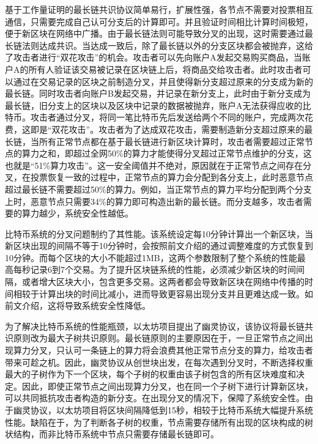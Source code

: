 基于工作量证明的最长链共识协议简单易行，扩展性强，各节点不需要对投票相互通信，只需要完成自己认可分支后的计算即可。并且验证时间相比计算时间极短，便于新区块在网络中广播。由于最长链法则可能导致分叉的出现，这时需要通过最长链法则达成共识。当达成一致后，除了最长链以外的分支区块都会被抛弃，这给了攻击者进行“双花攻击”的机会。攻击者可以先向账户A发起交易购买商品，当账户A的所有人验证该交易被记录在区块链上后，将商品交给攻击者。此时攻击者可以通过在交易记录的区块之前制造分叉，并且使得新分支超过原来的分支成为新的最长链。同时攻击者向账户B发起交易，并记录在新分支上，此时由于新分支成为最长链，旧分支上的区块以及区块中记录的数据被抛弃，账户A无法获得应收的比特币。攻击者通过分叉，将同一笔比特币先后发送给两个不同的账户，完成两次花费，这即是“双花攻击”。攻击者为了达成双花攻击，需要制造新分支超过原来的最长链，当所有正常节点都在基于最长链进行新区块计算时，攻击者需要超过正常节点的算力之和，即超过全网50\%的算力才能使得分叉超过正常节点维护的分支，这也就是“51\%算力攻击”。这一安全阈值并不绝对，原因就在于正常节点之间存在分叉，在投票恢复一致的过程中，正常节点的算力会分配到各分支上，此时恶意节点超过最长链不需要超过50\%的算力。例如，当正常节点的算力平均分配到两个分支上时，恶意节点只需要34\%的算力即可构造出新的最长链。而分支越多，攻击者需要的算力越少，系统安全性越低。

比特币系统的分叉问题制约了其性能。该系统设定每10分钟计算出一个新区块，当新区块出现的间隔不等于10分钟时，会按照前文介绍的通过调整难度的方式恢复到10分钟。而每个区块的大小不能超过1MB，这两个参数限制了整个系统的性能最高每秒记录6到7个交易。为了提升区块链系统的性能，必须减少新区块的时间间隔，或者增大区块大小，包含更多交易。这两者都会导致新区块在网络中传播的时间相较于计算出块的时间比减小，进而导致更容易出现分支并且更难达成一致。如前文介绍，这将导致系统安全性降低。

为了解决比特币系统的性能瓶颈，以太坊项目提出了幽灵协议，该协议将最长链共识原则改为最大子树共识原则。最长链原则的主要原因在于，一旦正常节点之间出现算力分叉，只认可一条链上的算力将会浪费其他正常节点分支的算力，给攻击者带来可趁之机。因此，幽灵协议从创世块出发，在每次遇到分叉时，不断选择权重最大的子树作为下一个区块，每个子树的权重由该子树包含的所有区块难度和决定。因此，即使正常节点之间出现算力分叉，也在同一个子树下进行计算新区块，可以共同抵抗攻击者构造的新分支。在出现分叉的情况下，保障了系统安全性。由于幽灵协议，以太坊项目将区块间隔降低到15秒，相较于比特币系统大幅提升系统性能。缺陷在于，为了判断各子树的权重，节点需要存储所有出现的区块构成的树状结构，而非比特币系统中节点只需要存储最长链即可。

